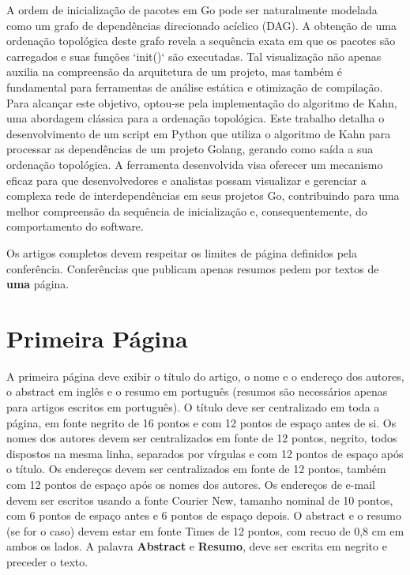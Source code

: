 \documentclass[12pt]{article}
\begin{document}
A ordem de inicialização de pacotes em Go pode ser naturalmente modelada como um grafo de dependências direcionado acíclico (DAG). A obtenção de uma ordenação topológica deste grafo revela a sequência exata em que os pacotes são carregados e suas funções `init()` são executadas. Tal visualização não apenas auxilia na compreensão da arquitetura de um projeto, mas também é fundamental para ferramentas de análise estática e otimização de compilação. Para alcançar este objetivo, optou-se pela implementação do algoritmo de Kahn, uma abordagem clássica para a ordenação topológica. Este trabalho detalha o desenvolvimento de um script em Python que utiliza o algoritmo de Kahn para processar as dependências de um projeto Golang, gerando como saída a sua ordenação topológica. A ferramenta desenvolvida visa oferecer um mecanismo eficaz para que desenvolvedores e analistas possam visualizar e gerenciar a complexa rede de interdependências em seus projetos Go, contribuindo para uma melhor compreensão da sequência de inicialização e, consequentemente, do comportamento do software.

Os artigos completos devem respeitar os limites de página definidos pela conferência.
Conferências que publicam apenas resumos pedem por textos de \textbf{uma} página.

\section{Primeira Página} \label{sec:firstpage}

A primeira página deve exibir o título do artigo, o nome e o endereço dos
autores, o abstract em inglês e o resumo em português (resumos são
necessários apenas para artigos escritos em português). O título deve ser centralizado
em toda a página, em fonte negrito de 16 pontos e com 12 pontos de espaço
antes de si. Os nomes dos autores devem ser centralizados em fonte de 12 pontos, negrito, todos
dispostos na mesma linha, separados por vírgulas e com 12 pontos de
espaço após o título. Os endereços devem ser centralizados em fonte de 12 pontos, também com
12 pontos de espaço após os nomes dos autores. Os endereços de e-mail devem ser
escritos usando a fonte Courier New, tamanho nominal de 10 pontos, com 6 pontos de espaço
antes e 6 pontos de espaço depois. O abstract e o resumo (se for o caso) devem estar em fonte Times de 12 pontos,
com recuo de 0,8 cm em ambos os lados. A palavra \textbf{Abstract} e \textbf{Resumo},
deve ser escrita em negrito e preceder o texto.
\end{document}
